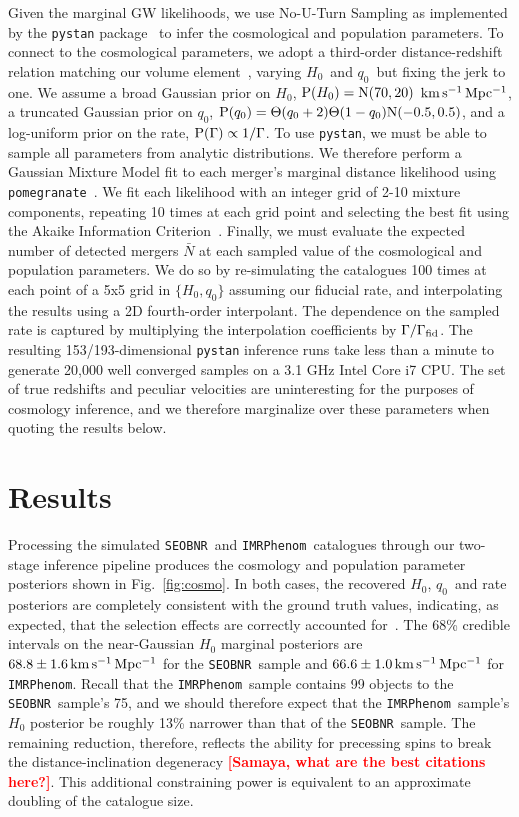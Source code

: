 \documentclass[%
 reprint,
 superscriptaddress,
 nofootinbib,
 amsmath,amssymb,
 aps,
]{revtex4-2}
\newcommand{\hubble}{\ensuremath{H_0}}
\newcommand{\decel}{\ensuremath{q_0}}
\newcommand{\prob}{\ensuremath{{\rm P}}}
\newcommand{\normal}{{\rm{N}}}
\newcommand{\nexp}{\bar{N}}
\newcommand{\rate}{\Gamma}
\newcommand{\step}{\Theta}
\newcommand{\kmsmpc}{\ensuremath{{\rm km\,s^{-1}\,Mpc^{-1}}}}
\newcommand{\seobnr}{\texttt{SEOBNR}}
\newcommand{\imrp}{\texttt{IMRPhenom}}
\newcommand{\smf}[1]{\textcolor{red}{\bf [#1]}}
\begin{document}
Given the marginal GW likelihoods, we use No-U-Turn Sampling as implemented by the \texttt{pystan} package~\cite{pystan} to infer the cosmological and population parameters. To connect to the cosmological parameters, we adopt a third-order distance-redshift relation matching our volume element~\cite{Visser:2004}, varying \hubble\ and \decel\ but fixing the jerk to one. We assume a broad Gaussian prior on \hubble, $\prob(\hubble)=\normal(70,20)$ \kmsmpc, a truncated Gaussian prior on \decel, $\prob(\decel)=\step(\decel+2)\step(1-\decel)\normal(-0.5,0.5)$, and a log-uniform prior on the rate, $\prob(\rate) \propto 1/\rate$. To use \texttt{pystan}, we must be able to sample all parameters from analytic distributions. We therefore perform a Gaussian Mixture Model fit to each merger's marginal distance likelihood using \texttt{pomegranate}~\cite{Schreiber:2017}. We fit each likelihood with an integer grid of 2-10 mixture components, repeating 10 times at each grid point and selecting the best fit using the Akaike Information Criterion~\cite{Akaike:1974}. Finally, we must evaluate the expected number of detected mergers $\nexp$ at each sampled value of the cosmological and population parameters. We do so by re-simulating the catalogues 100 times at each point of a 5x5 grid in $\{H_0,q_0\}$ assuming our fiducial rate, and interpolating the results using a 2D fourth-order interpolant. The dependence on the sampled rate is captured by multiplying the interpolation coefficients by $\Gamma/\Gamma_{\rm fid}$. The resulting 153/193-dimensional \texttt{pystan} inference runs take less than a minute to generate 20,000 well converged samples on a 3.1 GHz Intel Core i7 CPU. The set of true redshifts and peculiar velocities are uninteresting for the purposes of cosmology inference, and we therefore marginalize over these parameters when quoting the results below.


\section{Results} \label{sec:results}

Processing the simulated \seobnr\ and \imrp\ catalogues through our two-stage inference pipeline produces the cosmology and population parameter posteriors shown in Fig.~\ref{fig:cosmo}. In both cases, the recovered \hubble, \decel\ and rate posteriors are completely consistent with the ground truth values, indicating, as expected, that the selection effects are correctly accounted for~\cite{Mortlock_etal:2019}. The 68\% credible intervals on the near-Gaussian $\hubble$ marginal posteriors are $68.8 \pm 1.6\,\kmsmpc$ for the \seobnr\ sample and $66.6 \pm 1.0\,\kmsmpc$ for \imrp. Recall that the \imrp\ sample contains 99 objects to the \seobnr\ sample's 75, and we should therefore expect that the \imrp\ sample's $\hubble$ posterior be roughly 13\% narrower than that of the \seobnr\ sample. The remaining reduction, therefore, reflects the ability for precessing spins to break the distance-inclination degeneracy \smf{Samaya, what are the best citations here?}. This additional constraining power is equivalent to an approximate doubling of the catalogue size.
\end{document}
